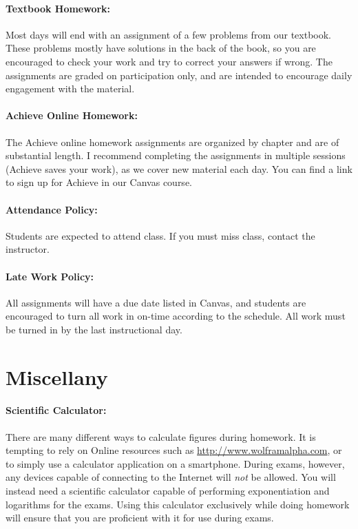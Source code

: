 \documentclass[12pt, letterpaper]{article}
\begin{document}
\paragraph{Textbook Homework:}
Most days will end with an assignment of a few problems from our textbook. These problems mostly have solutions in the back of the book, so you are encouraged to check your work and try to correct your answers if wrong. The assignments are graded on participation only, and are intended to encourage daily engagement with the material.

\paragraph{Achieve Online Homework:}
The Achieve online homework assignments are organized by chapter and are of substantial length. I recommend completing the assignments in multiple sessions (Achieve saves your work), as we cover new material each day. You can find a link to sign up for Achieve in our Canvas course.

\paragraph{Attendance Policy:}
Students are expected to attend class. If you must miss class, contact the instructor.

\paragraph{Late Work Policy:}
All assignments will have a due date listed in Canvas, and students are encouraged to turn all work in on-time according to the schedule. All work must be turned in by the last instructional day.

\section*{Miscellany}

\paragraph{Scientific Calculator:}
There are many different ways to calculate figures during homework. It is tempting to rely on Online resources such as \href{http://www.wolframalpha.com}{http://www.wolframalpha.com}, or to simply use a calculator application on a smartphone. During exams, however, any devices capable of connecting to the Internet will \emph{not} be allowed. You will instead need a scientific calculator capable of performing exponentiation and logarithms for the exams. Using this calculator exclusively while doing homework will ensure that you are proficient with it for use during exams.
\end{document}
